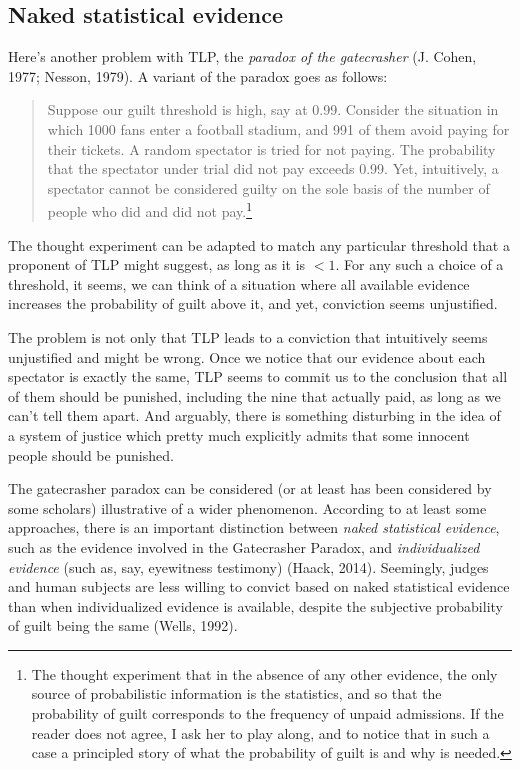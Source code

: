 \documentclass[10pt,dvipsnames,enabledeprecatedfontcommands]{scrartcl}
\begin{document}
\subsection{Naked statistical
evidence}\label{naked-statistical-evidence}

Here's another problem with TLP, the \emph{paradox of the gatecrasher}
(J. Cohen, 1977; Nesson, 1979). A variant of the paradox goes as
follows:

\begin{quote}
Suppose our guilt threshold is high, say at 0.99. Consider the situation in which 1000 fans enter a football stadium, and 991 of them avoid paying for their tickets. A random spectator is tried for not paying. The  probability that the spectator under trial did not pay exceeds 0.99.   Yet, intuitively, a spectator cannot be considered guilty on the sole basis of the number of people who did and did not pay.\footnote{The thought experiment that in the absence of any other evidence, the only source of probabilistic information is the statistics, and so that the probability of guilt corresponds to the frequency of unpaid admissions. If the reader does not agree, I ask her to play along, and to notice that in such a case a principled story of what the probability of guilt is and why is needed.}
\end{quote}

\noindent  The thought experiment can be adapted to match any particular
threshold that a proponent of TLP might suggest, as long as it is
\(<1\). For any such a choice of a threshold, it seems, we can think of
a situation where all available evidence increases the probability of
guilt above it, and yet, conviction seems unjustified.

The problem is not only that TLP leads to a conviction that intuitively
seems unjustified and might be wrong. Once we notice that our evidence
about each spectator is exactly the same, TLP seems to commit us to the
conclusion that all of them should be punished, including the nine that
actually paid, as long as we can't tell them apart. And arguably, there
is something disturbing in the idea of a system of justice which pretty
much explicitly admits that some innocent people should be punished.

The gatecrasher paradox can be considered (or at least has been
considered by some scholars) illustrative of a wider phenomenon.
According to at least some approaches, there is an important distinction
between \emph{naked statistical evidence}, such as the evidence involved
in the Gatecrasher Paradox, and \emph{individualized evidence} (such as,
say, eyewitness testimony) (Haack, 2014). Seemingly, judges and human
subjects are less willing to convict based on naked statistical evidence
than when individualized evidence is available, despite the subjective
probability of guilt being the same (Wells, 1992).
\end{document}
